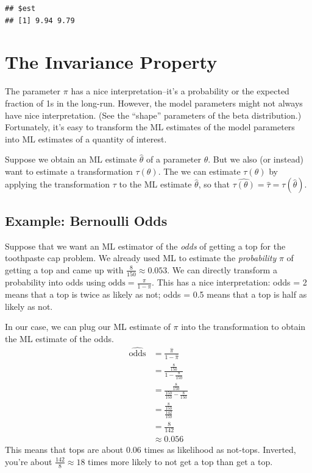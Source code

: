 \documentclass[
]{book}
\begin{document}
\begin{verbatim}
## $est
## [1] 9.94 9.79
\end{verbatim}

\hypertarget{the-invariance-property}{%
\section{The Invariance Property}\label{the-invariance-property}}

The parameter \(\pi\) has a nice interpretation--it's a probability or the expected fraction of 1s in the long-run. However, the model parameters might not always have nice interpretation. (See the ``shape'' parameters of the beta distribution.) Fortunately, it's easy to transform the ML estimates of the model parameters into ML estimates of a quantity of interest.

Suppose we obtain an ML estimate \(\hat{\theta}\) of a parameter \(\theta\). But we also (or instead) want to estimate a transformation \(\tau(\theta)\). The we can estimate \(\tau(\theta)\) by applying the transformation \(\tau\) to the ML estimate \(\hat{\theta}\), so that \(\widehat{\tau(\theta)} = \hat{\tau} = \tau(\hat{\theta})\).

\hypertarget{example-bernoulli-odds}{%
\subsection{Example: Bernoulli Odds}\label{example-bernoulli-odds}}

Suppose that we want an ML estimator of the \emph{odds} of getting a top for the toothpaste cap problem. We already used ML to estimate the \emph{probability} \(\pi\) of getting a top and came up with \(\frac{8}{150} \approx 0.053\). We can directly transform a probability into odds using \(\text{odds} = \frac{\pi}{1 - \pi}\). This has a nice interpretation: odds = 2 means that a top is twice as likely as not; odds = 0.5 means that a top is half as likely as not.

In our case, we can plug our ML estimate of \(\pi\) into the transformation to obtain the ML estimate of the odds.
\[
\begin{aligned}
\widehat{\text{odds}} &= \frac{\hat{\pi}}{1 - \hat{\pi}} \\
& = \frac{\frac{8}{150}}{1 - \frac{8}{150}} \\
& = \frac{\frac{8}{150}}{\frac{150}{150} - \frac{8}{150}} \\
& = \frac{\frac{8}{150}}{\frac{142}{150}} \\
& = \frac{8}{142} \\
& \approx 0.056
\end{aligned}
\]
This means that tops are about 0.06 times as likelihood as not-tops. Inverted, you're about \(\frac{142}{8} \approx 18\) times more likely to not get a top than get a top.
\end{document}
